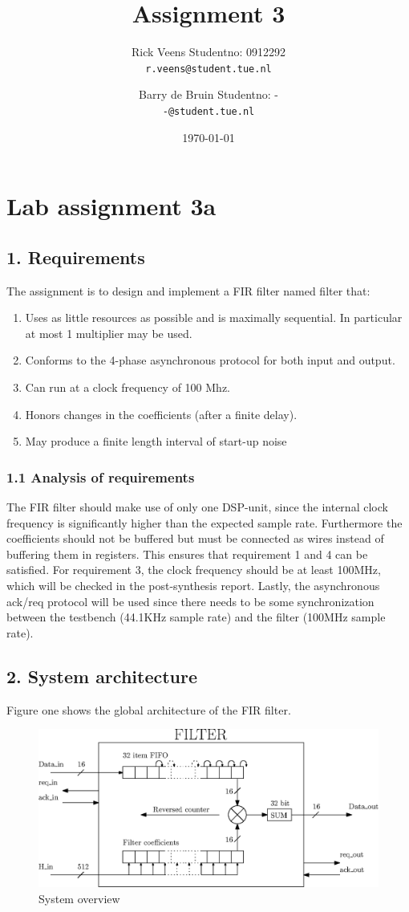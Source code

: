 \documentclass[a4paper,twoside,11pt, fleqn]{article}
\title{\vspace{-\baselineskip}\sffamily\bfseries Assignment 3}
\author{
	Rick Veens \qquad Studentno: 0912292\\
	\texttt{r.veens@student.tue.nl}
	\and
	Barry de Bruin \qquad Studentno: -\\
	\texttt{-@student.tue.nl}
}
\date{\today}
\begin{document}
\maketitle
\newpage

\section*{Lab assignment 3a}
\subsection*{1. Requirements}
The assignment is to design and implement a FIR filter named filter that:
\begin{enumerate}
\item Uses as little resources as possible and is maximally sequential. In particular at most 1
multiplier may be used.
\item Conforms to the 4-phase asynchronous protocol for both input and output.
\item Can run at a clock frequency of 100 Mhz.
\item Honors changes in the coefficients (after a finite delay).
\item May produce a finite length interval of start-up noise
\end{enumerate}

\subsubsection*{1.1 Analysis of requirements}
The FIR filter should make use of only one DSP-unit, since the internal clock frequency is significantly higher than the expected sample rate. Furthermore the coefficients should not be buffered but must be connected as wires instead of buffering them in registers. This ensures that requirement 1 and 4 can be satisfied. For requirement 3, the clock frequency should be at least 100MHz, which will be checked in the post-synthesis report. Lastly, the asynchronous ack/req protocol will be used since there needs to be some synchronization between the testbench (44.1KHz sample rate) and the filter (100MHz sample rate).


\subsection*{2. System architecture}
Figure one shows the global architecture of the FIR filter. 
\begin{figure}[h]
	\includegraphics[scale = 1]{Images/3a_blockdiagram}
    \caption{System overview}
\end{figure}
\end{document}
